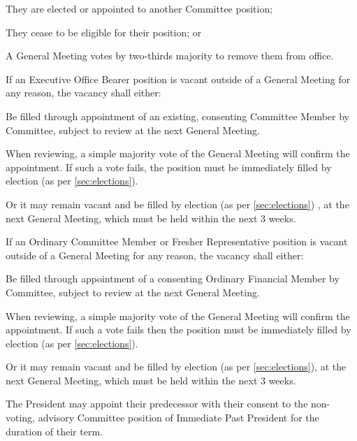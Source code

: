 \documentclass[a4paper]{article}
\begin{document}
\begin{myEnumerate}
\begin{myEnumerate}
            \item They are elected or appointed to another Committee position; 
            \item They cease to be eligible for their position; or
            \item A General Meeting votes by two-thirds majority  to remove them from office.
        \end{myEnumerate}
    \item \label{item:exec_vacancy} If an Executive Office Bearer position is vacant outside of a General Meeting for any reason, the vacancy shall either:
        \begin{myEnumerate}
            \item Be filled through appointment of an existing, consenting Committee Member by Committee, subject to review at the next General Meeting.
                \begin{myEnumerate}
                    \item When reviewing, a simple majority vote of the General Meeting will confirm the appointment. If such a vote fails, the position must be immediately filled by election (as per \cref{sec:elections}).
                \end{myEnumerate}
            \item Or it may remain vacant and be filled by election (as per \cref{sec:elections}) , at the next General Meeting, which must be held within the next 3 weeks.
        \end{myEnumerate}
    \item \label{item:ocm_vacancy} If an Ordinary Committee Member or Fresher Representative position is vacant outside of a General Meeting for any reason, the vacancy shall either:
        \begin{myEnumerate}
            \item Be filled through appointment of a consenting Ordinary Financial Member by Committee, subject to review at the next General Meeting.
                \begin{myEnumerate}
                    \item When reviewing, a simple majority vote of the General Meeting will confirm the appointment. If such a vote fails then the position must be immediately filled by election (as per \cref{sec:elections}).
                \end{myEnumerate}
            \item Or it may remain vacant and be filled by election (as per \cref{sec:elections}), at the next General Meeting, which must be held within the next 3 weeks.
        \end{myEnumerate}
    \item The President may appoint their predecessor with their consent to the non-voting, advisory Committee position of Immediate Past President for the duration of their term.
\end{myEnumerate}
\end{document}
